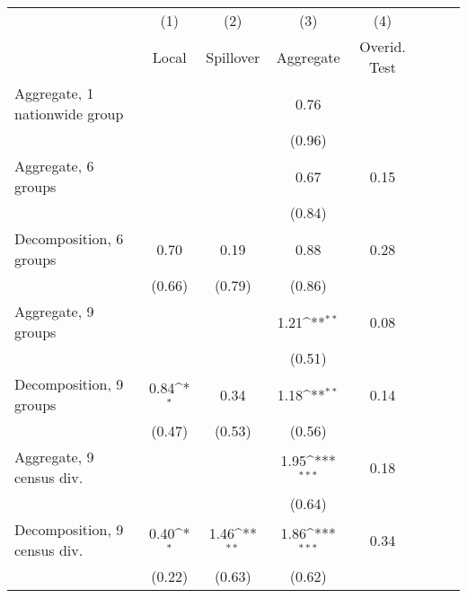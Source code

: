 \def\sym#1{\ifmmode^{#1}\else\(^{#1}\)\fi}          \begin{tabular}{l*{7}{c}}          \hline
  & (1) & (2) & (3)  & (4) \\ & Local & Spillover & Aggregate  & Overid. Test \\ \hline
Aggregate, 1 nationwide group&                     &                     &        0.76         &            \\
            &                     &                     &      (0.96)         &            \\
Aggregate, 6 groups&                     &                     &        0.67         &        0.15\\
            &                     &                     &      (0.84)         &            \\
Decomposition, 6 groups&        0.70         &        0.19         &        0.88         &        0.28\\
            &      (0.66)         &      (0.79)         &      (0.86)         &            \\
Aggregate, 9 groups&                     &                     &        1.21\sym{**} &        0.08\\
            &                     &                     &      (0.51)         &            \\
Decomposition, 9 groups&        0.84\sym{*}  &        0.34         &        1.18\sym{**} &        0.14\\
            &      (0.47)         &      (0.53)         &      (0.56)         &            \\
Aggregate, 9 census div.&                     &                     &        1.95\sym{***}&        0.18\\
            &                     &                     &      (0.64)         &            \\
Decomposition, 9 census div.&        0.40\sym{*}  &        1.46\sym{**} &        1.86\sym{***}&        0.34\\
            &      (0.22)         &      (0.63)         &      (0.62)         &            \\
\hline          \end{tabular}

